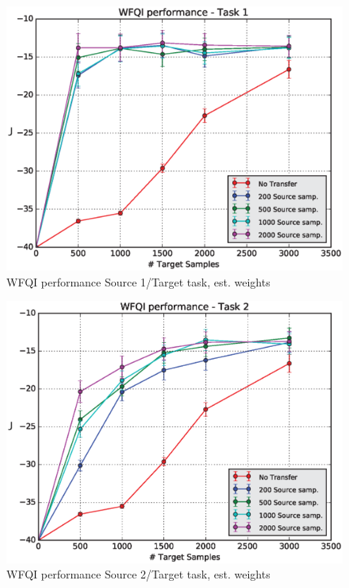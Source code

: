     \begin{figure}[H]
      \centering
      \includegraphics[scale=0.5]{images/WFQIPerf1.eps}
      \caption{WFQI performance Source 1/Target task, est. weights}
      \label{perf1E}
    \end{figure}
    \begin{figure}[H]
      \centering
      \includegraphics[scale=0.5]{images/WFQIPerf2.eps}
      \caption{WFQI performance Source 2/Target task, est. weights}
      \label{perf2E}
    \end{figure}
